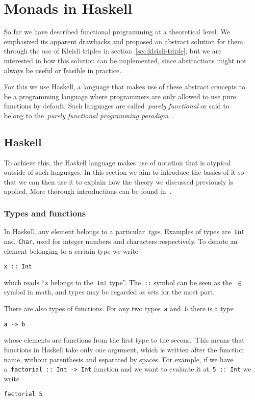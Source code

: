 \documentclass[a4paper]{article}
\theoremstyle{plain}
\theoremstyle{definition}
\begin{document}
\section{Monads in Haskell}
So far we have described functional programming at a theoretical level. We
emphasized its apparent drawbacks and proposed an abstract solution for them
through the use of Kleisli triples in section~\ref{sec:kleisli-triple}, but we
are interested in how this solution can be implemented, since abstractions might
not always be useful or feasible in practice.

For this we use Haskell, a language that makes use of these abstract concepts to
be a programming language where programmers are only allowed to use pure
functions by default. Such languages are called~\emph{purely functional} or said
to belong to the~\emph{purely functional programming
paradigm}~\cite{paradigms-overview}.

\subsection{Haskell}
To achieve this, the Haskell language makes use of notation that is atypical
outside of such languages. In this section we aim to introduce the basics of it
so that we can then use it to explain how the theory we discussed previously is
applied. More thorough introductions can be found in~\cite{haskell-org-docs}.

\subsubsection{Types and functions}
In Haskell, any element belongs to a particular~\emph{type}. Examples of types
are~\texttt{Int} and~\texttt{Char}, used for integer
numbers and characters respectively. To denote an element belonging to a certain
type we write
\begin{verbatim}
x :: Int
\end{verbatim}
which reads ``\texttt{x} belongs to the~\texttt{Int}
type''.
The~\texttt{::} symbol can be seen as the~\(\in\) symbol in math,
and types may be regarded as sets for the most part.

There are also types of functions. For any two types~\texttt{a}
and~\texttt{b} there is a type
\begin{verbatim}
a -> b
\end{verbatim}
whose elements are functions from the first type to the second. This means that
functions in Haskell take only one argument, which is written after the function
name, without parenthesis and separated by spaces. For example, if we have
a~\texttt{factorial :: Int -> Int} function and we want to evaluate
it at~\texttt{5 :: Int} we write
\begin{verbatim}
factorial 5
\end{verbatim}
\end{document}
